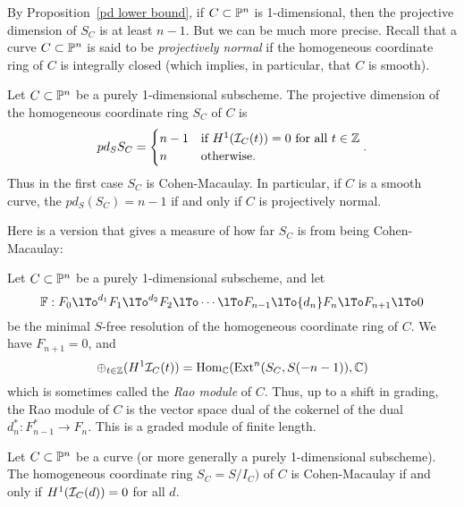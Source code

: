   
  By Proposition~\ref{pd lower bound}, if $C\subset \PP^{n}$ is 1-dimensional, then the projective dimension of $S_{C}$ is at least $n-1$. But we can be much more precise. Recall that a curve $C\subset \PP^{n}$ is said to be \emph{projectively normal} if the homogeneous coordinate ring of $C$ is integrally closed (which implies, in particular, that $C$ is smooth).

\begin{theorem}
 Let $C\subset \PP^{n}$ be a purely 1-dimensional subscheme. The projective dimension of the homogeneous coordinate ring $S_{C}$ of $C$  is
$$
 pd_{S}S_{C} = 
\begin{cases}
n-1 &\hbox{if $H^{1}(\sI_{C}(t)) = 0$ for all $t\in \ZZ$}\\
n &\hbox{otherwise}.
\end{cases}.
$$
Thus in the first case $S_{C}$ is Cohen-Macaulay. In particular, if $C$ is a smooth curve, the $pd_{S}(S_{C}) = n-1$ if and only if $C$ is projectively normal. 
\end{theorem}

Here is a version that gives a measure of how far $S_C$ is  from being Cohen-Macaulay:

\begin{theorem}
Let $C\subset \PP^{n}$ be a purely 1-dimensional subscheme, and let  
$$
\FF: F_{0}\lTo^{d_{1}} F_{1}\lTo^{d_{2}} F_{2}\lTo \cdots \lTo F_{n-1}\lTo {d_{n}}F_{n}\lTo F_{n+1} \lTo 0
$$
be the minimal $S$-free resolution of the homogeneous coordinate ring of $C$. We have $F_{n+1}=0$, and 
$$
\oplus_{t\in \ZZ} (H^{1}\sI_{C}(t)) = \Hom_{\CC}(\Ext^{n}(S_{C}, S(-n-1)),\CC)
$$ 
which is sometimes called the \emph{Rao module} of $C$. Thus, up to a shift in grading,
the Rao module of $C$ is the vector space dual of the cokernel of the dual $d_{n}^{*}: F_{n-1}^{*}\to F_{n}$. This is a graded module of finite length.
\end{theorem}




\begin{theorem}
 Let $C\subset \PP^{n}$ be a  curve (or more generally a purely 1-dimensional subscheme). The homogeneous coordinate ring $S_{C}= S/I_{C})$ of $C$ is Cohen-Macaulay if and only if
 $H^{1}(\cI_{C}(d)) = 0 $ for all $d$.
\end{theorem}

